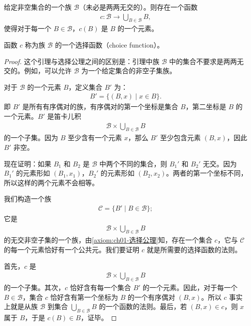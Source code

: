\documentclass[../../main.tex]{subfiles}
\begin{document}
\begin{lemma}[选择函数的存在性]\label{lemma:ch01-选择函数}
给定非空集合的一个族 $\mathcal{B}$（未必是两两无交的）。则存在一个函数
\begin{align*}
c: \mathcal{B} \longrightarrow \bigcup_{B \in \mathcal{B}} B,
\end{align*}
使得对于每一个 $B \in \mathcal{B}$，$c(B)$ 是 $B$ 的一个元素。

函数 $c$ 称为族 $\mathcal{B}$ 的一个选择函数（choice function）。
\end{lemma}

\begin{proof}
这个引理与选择公理之间的区别是：引理中族 $\mathcal{B}$ 中的集合不要求是两两无交的。例如，可以允许 $\mathcal{B}$ 为一个给定集合的非空子集族。

对于 $\mathcal{B}$ 的一个元素 $B$，定义集合 $B'$ 为：
\begin{align*}
B' = \{(B, x) \mid x \in B\}.
\end{align*}
即 $B'$ 是所有有序偶对的族，有序偶对的第一个坐标是集合 $B$，第二坐标是 $B$ 的一个元素。$B'$ 是笛卡儿积
\begin{align*}
\mathcal{B} \times \bigcup_{B \in \mathcal{B}} B
\end{align*}
的一个子集。因为 $B$ 至少含有一个元素 $x$，那么 $B'$ 至少包含元素 $(B, x)$，因此 $B'$ 非空。

现在证明：如果 $B_{1}$ 和 $B_{2}$ 是 $\mathcal{B}$ 中两个不同的集合，则 $B_{1}'$ 和 $B_{2}'$ 无交。因为 $B_{1}'$ 的元素形如 $(B_{1}, x_{1})$，$B_{2}'$ 的元素形如 $(B_{2}, x_{2})$。两者的第一个坐标不同，所以这样的两个元素不会相等。

我们构造一个族
\begin{align*}
\mathcal{C} = \{B' \mid B \in \mathcal{B}\};
\end{align*}
它是
\begin{align*}
\mathcal{B} \times \bigcup_{B \in \mathcal{B}} B
\end{align*}
的无交非空子集的一个族，由\cref{axiom:ch01-选择公理}知，存在一个集合 $c$，它与 $\mathcal{C}$ 的每一个元素恰好有一个公共元。我们要证明 $c$ 就是所需要的选择函数的法则。

首先，$c$ 是
\begin{align*}
\mathcal{B} \times \bigcup_{B \in \mathcal{B}} B
\end{align*}
的一个子集。其次，$c$ 恰好含有每一个集合 $B'$ 的一个元素。因此，对于每一个 $B \in \mathcal{B}$，集合 $c$ 恰好含有第一个坐标为 $B$ 的一个有序偶对 $(B, x)$。所以 $c$ 事实上就是从族 $\mathcal{B}$ 到集合 $\bigcup_{B \in \mathcal{B}} B$ 的一个函数的法则。最后，若 $(B, x) \in c$，则 $x$ 属于 $B$，于是 $c(B) \in B$，证毕。
\end{proof}
\end{document}
